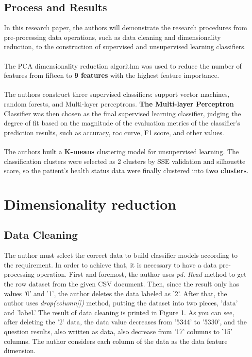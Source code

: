 \documentclass[10pt,twocolumn]{article}
\begin{document}
	\subsection{Process and Results}
	In this research paper, the authors will demonstrate the research procedures from pre-processing data operations, such as data cleaning and dimensionality reduction, to the construction of supervised and unsupervised learning classifiers.
		\\ \hspace*{\fill} \\
	The PCA dimensionality reduction algorithm was used to reduce the number of features from fifteen to \textbf{9 features} with the highest feature importance.
		\\ \hspace*{\fill} \\
	The authors construct three supervised classifiers: support vector machines, random forests, and Multi-layer perceptrons. \textbf{The Multi-layer Perceptron} Classifier was then chosen as the final supervised learning classifier, judging the degree of fit based on the magnitude of the evaluation metrics of the classifier's prediction results, such as accuracy, roc curve, F1 score, and other values.
		\\ \hspace*{\fill} \\
	The authors built a \textbf{K-means} clustering model for unsupervised learning. The classification clusters were selected as 2 clusters by SSE validation and silhouette score, so the patient's health status data were finally clustered into \textbf{two clusters}.
	
	\section{Dimensionality reduction}
	\subsection{Data Cleaning}
	The author must select the correct data to build classifier models according to the requirement. In order to achieve that, it is necessary to have a data pre-processing operation. First and foremost, the author uses \textit{pd. Read} method to get the row dataset from the given CSV document. Then, since the result only has values '0' and '1', the author deletes the data labeled as '2'. After that, the author uses \textit{drop(column[])} method, putting the dataset into two pieces, 'data' and 'label.' The result of data cleaning is printed in Figure 1. As you can see, after deleting the '2' data, the data value decreases from '5344' to '5330', and the question results, also written as data, also decrease from '17' columns to '15' columns. The author considers each column of the data as the data feature dimension.
	
\end{document}
